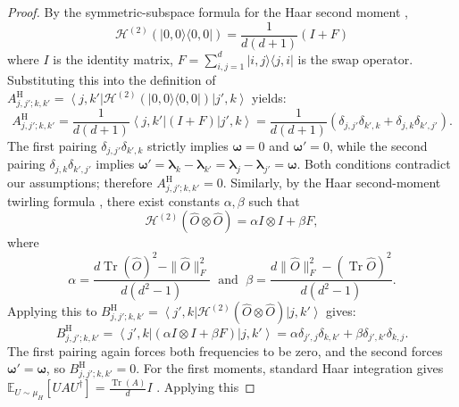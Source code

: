 \documentclass[%
 reprint,
 amsmath,amssymb,
 aps,
 pra,
]{revtex4-2}
\theoremstyle{definition}
\begin{document}
\begin{proof}
By the symmetric-subspace formula for the Haar second moment \citet[Theorem~22]{Mele2024},
\begin{equation}
\mathcal H^{(2)}(|0,0\rangle\langle0,0|) = \frac{1}{d(d+1)}(I+F)
\end{equation}
where $I$ is the identity matrix, \(F=\sum_{i, j=1}^d|i, j\rangle\langle j, i|\) is the swap operator. Substituting this into the definition of $A^{\mathrm H}_{j,j';k,k'}=\left\langle j,k'\right| \mathcal H^{(2)} \left(|0,0\rangle\langle0,0| \right) \left|j',k\right\rangle$ yields:
\begin{equation}
A^{\mathrm H}_{j,j';k,k'}
=
\frac{1}{d(d+1)}
\left\langle j,k'\right| (I+F) \left|j',k\right\rangle
=
\frac{1}{d(d+1)}
\left( \delta_{j,j'}\delta_{k',k} + \delta_{j,k}\delta_{k',j'} \right).
\label{eq:AH_pairing_compact}
\end{equation}
The first pairing $\delta_{j,j'}\delta_{k',k}$ strictly implies $\bm{\omega}=0$ and $\bm{\omega}'=0$, while the second pairing $\delta_{j,k}\delta_{k',j'}$ implies $\bm{\omega}' = \bm{\lambda}_k-\bm{\lambda}_{k'} = \bm{\lambda}_j-\bm{\lambda}_{j'} = \bm{\omega}$. Both conditions contradict our assumptions; therefore $A^{\mathrm H}_{j,j';k,k'}=0$. Similarly, by the Haar second-moment twirling formula \citet[Corollary~13]{Mele2024}, there exist constants $\alpha,\beta$ such that
\begin{equation}
\mathcal H^{(2)}(\hat O\otimes\hat O) = \alpha I\otimes I+\beta F,
\end{equation}
where
\begin{equation}
\label{eq:decomposition_coefficient}
\alpha=\frac{d\operatorname{Tr}(\hat{O})^2- \|\hat{O}\|_F^2}{d(d^2-1)} \; \text { and } \; \beta=\frac{d\|\hat{O}\|_F^2-(\operatorname{Tr} \hat{O})^2}{d\left(d^2-1\right)}.
\end{equation}
Applying this to $B^{\mathrm H}_{j,j';k,k'}=\left\langle j',k\right| \mathcal H^{(2)} \left(\hat O\otimes\hat O \right) \left|j,k'\right\rangle$ gives:
\begin{equation}
B^{\mathrm H}_{j,j';k,k'}
=
\left\langle j',k\right| (\alpha I\otimes I+\beta F) \left|j,k'\right\rangle
=
\alpha\delta_{j',j}\delta_{k,k'} + \beta\delta_{j',k'}\delta_{k,j}.
\label{eq:BH_pairing_compact}
\end{equation}
The first pairing again forces both frequencies to be zero, and the second forces $\bm{\omega}'=\bm{\omega}$, so $B^{\mathrm H}_{j,j';k,k'}=0$. For the first moments, standard Haar integration gives $\mathbb{E}_{U\sim\mu_H} [ U A U^\dagger ] = \frac{\operatorname{Tr}(A)}{d}I$ \cite{Roberts2017}. Applying this

\end{proof}
\end{document}
